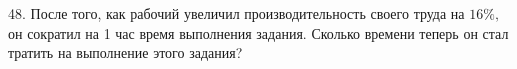 48. После того, как рабочий увеличил производительность своего труда на $16\%,$ он сократил на 1 час время выполнения задания. Сколько времени теперь он стал тратить на выполнение этого задания?\\
